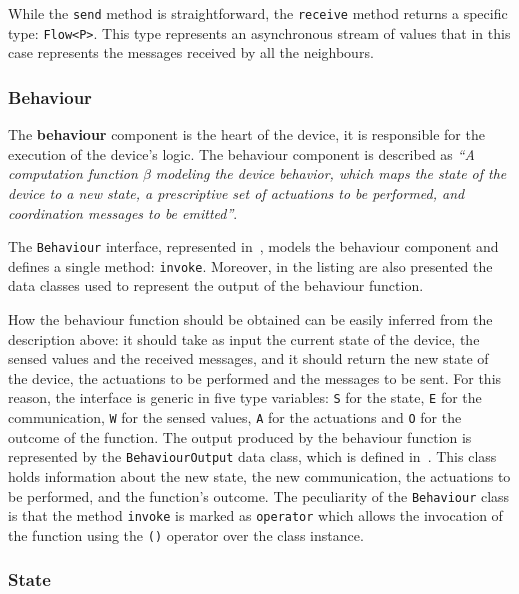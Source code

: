 While the \texttt{send} method is straightforward, the \texttt{receive} method returns a specific type: \texttt{Flow<P>}.
This type represents an asynchronous stream of values that in this case represents the messages received by all the neighbours.

\subsubsection{Behaviour}

The \textbf{behaviour} component is the heart of the device, it is responsible for the execution of the device's logic.
The behaviour component is described as \textit{``A computation function $\beta$
	modeling the device behavior, which maps the state of the device to a new state, a prescriptive set of actuations to be performed,
	and coordination messages to be emitted''}.

The \texttt{Behaviour} interface, represented in~, models the behaviour component and defines a single method:
\texttt{invoke}. Moreover, in the listing are also presented the data classes used to represent the output of the behaviour function.



How the behaviour function should be obtained can be easily inferred from the description above: it should take as input the current state of
the device, the sensed values and the received messages, and it should return the new state of the device, the actuations to be performed and the
messages to be sent. For this reason, the interface is generic in five type variables: \texttt{S} for the state, \texttt{E} for the communication,
\texttt{W} for the sensed values, \texttt{A} for the actuations and \texttt{O} for the outcome of the function.
The output produced by the behaviour function is represented by the \texttt{BehaviourOutput} data class, which is defined
in~. This class holds information about the new state, the new communication, the actuations to be performed, and the
function's outcome.
The peculiarity of the \texttt{Behaviour} class is that the method \texttt{invoke} is marked as \texttt{operator} which allows the invocation of the
function using the \texttt{()} operator over the class instance.

\subsubsection{State}

